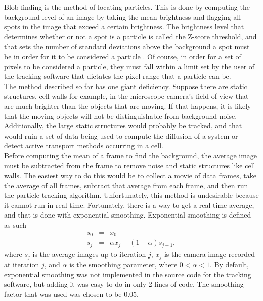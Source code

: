 \documentclass[11pt,letterpaper]{article}
\begin{document}
Blob finding is the method of locating particles. This is done by computing the
background level of an image by taking the mean brightness and flagging all
spots in the image that exceed a certain brightness. The brightness level that
determines whether or not a spot is a particle is called the Z-score threshold,
and that sets the number of standard deviations above the background a spot must
be in order for it to be considered a particle \cite{LabSoftware}. Of course, in
order for a set of pixels to be considered a particle, they must fall within a
limit set by the user of the tracking software that dictates the pixel range
that a particle can be.\\

The method described so far has one giant deficiency. Suppose there are static
structures, cell walls for example, in the microscope camera's field of view
that are much brighter than the objects that are moving. If that happens, it is
likely that the moving objects will not be distinguishable from background
noise. Additionally, the large static structures would probably be tracked, and
that would ruin a set of data being used to compute the diffusion of a system or
detect active transport methods occurring in a cell.\\

Before computing the mean of a frame to find the background, the average image
must be subtracted from the frame to remove noise and static structures like
cell walls. The easiest way to do this would be to collect a movie of data
frames, take the average of all frames, subtract that average from each frame,
and then run the particle tracking algorithm. Unfortunately, this method is
undesirable because it cannot run in real time. Fortunately, there is a way to
get a real-time average, and that is done with exponential smoothing.
Exponential smoothing is defined as such \cite{ExpSmoothWiki}
\begin{equation}
    \begin{array}{rcl}
        s_0 & = & x_0 \\
        s_j & = & \alpha x_j + \left(1-\alpha\right) s_{j-1},
    \end{array}
\end{equation}
where $s_j$ is the average images up to iteration $j$, $x_j$ is the camera image
recorded at iteration $j$, and $\alpha$ is the smoothing parameter, where
$0 < \alpha < 1$. By default, exponential smoothing was not implemented in the
source code for the tracking software, but adding it was easy to do in only 2
lines of code. The smoothing factor that was used was chosen to be 0.05.\\
\end{document}
